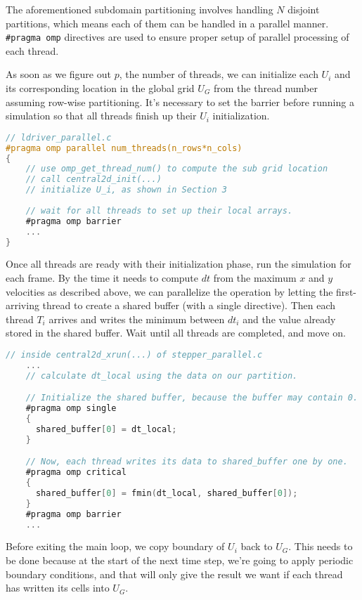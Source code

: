 \documentclass{article}
\begin{document}
The aforementioned subdomain partitioning involves handling $N$ disjoint partitions, which means each of them can be handled in a parallel manner. \texttt{\#pragma omp} directives are used to ensure proper setup of parallel processing of each thread.

As soon as we figure out $p$, the number of threads, we can initialize each $U_i$ and its corresponding location in the global grid $U_G$ from the thread number assuming row-wise partitioning. It's necessary to set the barrier before running a simulation so that all threads finish up their $U_i$ initialization.

\begin{lstlisting}[language=C]
// ldriver_parallel.c
#pragma omp parallel num_threads(n_rows*n_cols)
{
    // use omp_get_thread_num() to compute the sub grid location
    // call central2d_init(...)
    // initialize U_i, as shown in Section 3
    
    // wait for all threads to set up their local arrays.
    #pragma omp barrier
    ...
}
\end{lstlisting}

Once all threads are ready with their initialization phase, run the simulation for each frame. By the time it needs to compute $dt$ from the maximum $x$ and $y$ velocities as described above, we can parallelize the operation by letting the first-arriving thread to create a shared buffer (with a single directive). Then each thread $T_i$ arrives and writes the minimum between $dt_i$ and the value already stored in the shared buffer. Wait until all threads are completed, and move on.

\begin{lstlisting}[language=C]
// inside central2d_xrun(...) of stepper_parallel.c
    ...
    // calculate dt_local using the data on our partition.

    // Initialize the shared buffer, because the buffer may contain 0.
    #pragma omp single
    {
      shared_buffer[0] = dt_local;
    }

    // Now, each thread writes its data to shared_buffer one by one.
    #pragma omp critical
    {
      shared_buffer[0] = fmin(dt_local, shared_buffer[0]);
    }
    #pragma omp barrier
    ...
\end{lstlisting}

Before exiting the main loop, we copy boundary of $U_i$ back to $U_G$. This needs to be done because at the start of the next time step, we're going to apply periodic boundary conditions, and that will only give the result we want if each thread has written its cells into $U_G$.
\end{document}
